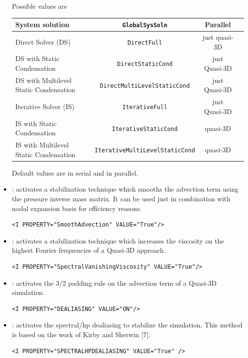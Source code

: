 \begin{itemize}
Possible values are
\begin{center}
\footnotesize
\begin{tabular}{lccc}
\toprule
{System solution} & \texttt{GlobalSysSoln} &{Parallel}\\
\midrule
Direct Solver (DS) & \texttt{DirectFull} & just quasi-3D \\
DS with Static Condensation  & \texttt{DirectStaticCond} & just Quasi-3D \\
DS with Multilevel Static Condensation & \texttt{DirectMultiLevelStaticCond} & just Quasi-3D \\
 Iterative Solver (IS) & \texttt{IterativeFull} & just Quasi-3D \\
IS with Static Condensation  & \texttt{IterativeStaticCond} & quasi-3D \\
IS with Multilevel Static Condensation & \texttt{IterativeMultiLevelStaticCond} & quasi-3D \\
\bottomrule
\end{tabular}
\end{center}

Default values are  in serial and
 in parallel.

\item {}: activates a stabilization technique which smooths
the advection term using the pressure inverse mass matrix. It can be used just in combination with nodal expansion basis for efficiency reasons.

\begin{lstlisting}[style=XMLStyle]
<I PROPERTY="SmoothAdvection" VALUE="True"/>
\end{lstlisting}


\item {}: activates a stabilization technique
which increases the viscosity on the highest Fourier frequencies of a Quasi-3D approach.
\begin{lstlisting}[style=XMLStyle]
<I PROPERTY="SpectralVanishingViscosity" VALUE="True"/>
\end{lstlisting}

\item {}: activates the 3/2 padding rule on the advection term
of a Quasi-3D simulation.
\begin{lstlisting}[style=XMLStyle]
<I PROPERTY="DEALIASING" VALUE="ON"/>
\end{lstlisting}


\item {}: activates the spectral/hp dealiasing to
stabilize the simulation. This method is based on the work of Kirby and Sherwin [7].
\begin{lstlisting}[style=XMLStyle]
<I PROPERTY="SPECTRALHPDEALIASING" VALUE="True" />
\end{lstlisting}

\end{itemize}


